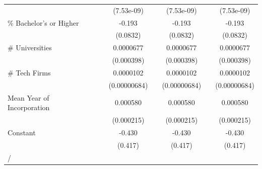 {\begin{tabular}{l*{7}{c}}
                    &                     &                     &  (7.53e-09)         &                     &  (7.53e-09)         &                     &  (7.53e-09)         \\
\addlinespace
\% Bachelor's or Higher&                     &                     &      -0.193\sym{*}  &                     &      -0.193\sym{*}  &                     &      -0.193\sym{*}  \\
                    &                     &                     &    (0.0832)         &                     &    (0.0832)         &                     &    (0.0832)         \\
\addlinespace
\# Universities     &                     &                     &   0.0000677         &                     &   0.0000677         &                     &   0.0000677         \\
                    &                     &                     &  (0.000398)         &                     &  (0.000398)         &                     &  (0.000398)         \\
\addlinespace
\# Tech Firms       &                     &                     &   0.0000102         &                     &   0.0000102         &                     &   0.0000102         \\
                    &                     &                     &(0.00000684)         &                     &(0.00000684)         &                     &(0.00000684)         \\
\addlinespace
Mean Year of Incorporation&                     &                     &    0.000580\sym{**} &                     &    0.000580\sym{**} &                     &    0.000580\sym{**} \\
                    &                     &                     &  (0.000215)         &                     &  (0.000215)         &                     &  (0.000215)         \\
\addlinespace
Constant            &                     &                     &      -0.430         &                     &      -0.430         &                     &      -0.430         \\
                    &                     &                     &     (0.417)         &                     &     (0.417)         &                     &     (0.417)         \\
\midrule
/                   &                     &                     &                     &                     &                     &                     &                     \\

\end{tabular}}
